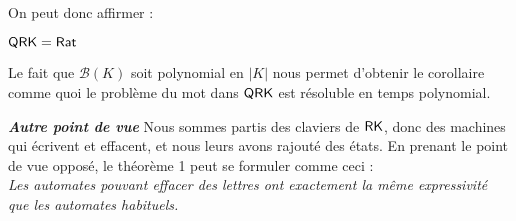 \documentclass[12pt, a4paper]{article}
\newcounter{thm}
\begin{document}
    On peut donc affirmer :
    \begin{QRKegalRat}\label{th1}
        $\mathsf{QRK} = \mathsf{Rat}$
    \end{QRKegalRat}
    Le fait que $\mathcal{B}(K)$ soit polynomial en $|K|$ nous permet d'obtenir le corollaire comme quoi le problème du mot dans $\mathsf{QRK}$ est résoluble en temps polynomial.
    \begin{thmbox}[L]{\textbf{\emph{Autre point de vue}}}
        Nous sommes partis des claviers de $\mathsf{RK}$, donc des machines qui écrivent et effacent, et nous leurs avons rajouté des états.
        En prenant le point de vue opposé, le théorème 1 peut se formuler comme ceci : \\
        \emph{Les automates pouvant effacer des lettres ont exactement la même expressivité que les automates habituels.}
    \end{thmbox}
\end{document}
